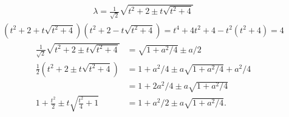 \documentclass[10pt,a4paper]{article}
\begin{document}
\begin{align*}
    \lambda = \frac{1}{\sqrt 2} \sqrt{ t^2 + 2 \pm t \sqrt{ t^2 + 4 } } 
\end{align*}
\begin{align*}
    \left( t^2 + 2 + t \sqrt{ t^2 + 4 } \right)
    \left( t^2 + 2 - t \sqrt{ t^2 + 4 } \right)
    =
    t^{4} + 4 t^{2} + 4
    -
    t^{2} ( t^{2} + 4 )
    =
    4
\end{align*}
\begin{align*}
    \frac{1}{\sqrt 2} \sqrt{ t^2 + 2 \pm t \sqrt{ t^2 + 4 } } 
    &=
    \sqrt{1+a^2/4} \pm a/2
    \\
    \frac 1 2 \left( t^2 + 2 \pm t \sqrt{ t^2 + 4 } \right)
    &=
    1+a^2/4
    \pm
    a \sqrt{1+a^2/4}
    + 
    a^2/4
    \\&=
    1
    +
    2a^2/4
    \pm
    a \sqrt{1+a^2/4}
    \\
    1 + \frac{t^2}{2} \pm t \sqrt{ \frac{t^2}{4} + 1 } 
    &=
    1
    +
    a^2/2
    \pm
    a \sqrt{1+a^2/4}
    .
\end{align*}
\color{black}
\end{document}
